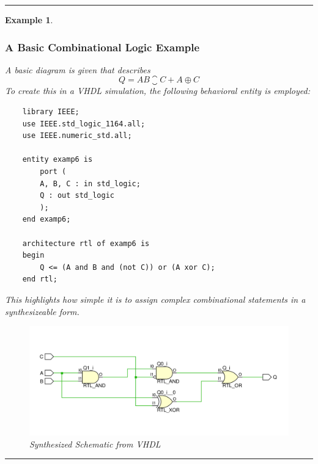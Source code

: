 \documentclass[12pt]{article}
\newtheorem{example}{Example}
\newenvironment{examp}
{
	\vspace{.5cm}
	\hrule
\begin{example}\upshape}
	{\hrule
		\vspace{0.5cm}
\end{example}}
\begin{document}
\begin{examp}
	\subsubsection*{A Basic Combinational Logic Example}
	A basic diagram is given that describes
	\[
		Q = AB\closure{C} + A \oplus C
	\]
	To create this in a VHDL simulation, the following behavioral entity is
	employed:
	\begin{verbatim}
	library IEEE;
	use IEEE.std_logic_1164.all;
	use IEEE.numeric_std.all;

	entity examp6 is 
		port (
		A, B, C : in std_logic;
		Q : out std_logic
		);
	end examp6;

	architecture rtl of examp6 is
	begin
		Q <= (A and B and (not C)) or (A xor C);
	end rtl;
	\end{verbatim}
	
	This highlights how simple it is to assign complex combinational statements in 
	a synthesizeable form.
	
	\begin{figure}[H]
		\includegraphics[scale=.45]{examp123}
		\caption{Synthesized Schematic from VHDL}
	\end{figure}
	
\end{examp}
\end{document}
